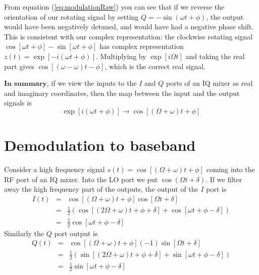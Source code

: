 From equation (\ref{eq:modulationRaw}) you can see that if we reverse the orientation of our rotating signal by setting $Q=-\sin(\omega t + \phi)$, the output would have been negatively detuned, and would have had a negative phase shift. This is consistent with our complex representation: the clockwise rotating signal $\cos[\omega t + \phi] - \sin[\omega t + \phi]$ has complex representation $z(t) = \exp[-i(\omega t + \phi)]$. Multiplying by $\exp[i\Omega t]$ and taking the real part gives $\cos[(\omega-\omega)t - \phi]$, which is the correct real signal.

$\textbf{In summary}$, if we view the inputs to the $I$ and $Q$ ports of an IQ mixer as real and imaginary coordinates, then the map between the input and the output signals is \begin{equation}
\exp[i(\omega t + \phi)] \rightarrow \cos[(\Omega+\omega)t + \phi] \end{equation}

\section{Demodulation to baseband}

Consider a high frequency signal $s(t) = \cos [ (\Omega+\omega)t + \phi ]$ coming into the RF port of an IQ mixer. Into the LO port we put $\cos(\Omega t + \delta)$. If we filter away the high frequency part of the outputs, the output of the $I$ port is \begin{eqnarray}
I(t) &=& \cos [ (\Omega + \omega)t + \phi ]\cos [ \Omega t + \delta ] \nonumber \\
&=& \frac{1}{2}\left( \cos [(2\Omega + \omega)t + \phi + \delta ] + \cos [ \omega t + \phi - \delta ] \right) \nonumber \\
&=& \frac{1}{2} \cos [ \omega t + \phi - \delta ] \end{eqnarray}
Similarly the $Q$ port output is \begin{eqnarray}
Q(t) &=& \cos [ (\Omega + \omega)t + \phi ](-1)\sin [ \Omega t + \delta ] \nonumber \\
&=& \frac{1}{2}\left( \sin [(2\Omega + \omega)t + \phi + \delta ] + \sin [ \omega t + \phi - \delta ] \right) \nonumber \\
&=& \frac{1}{2} \sin [ \omega t + \phi - \delta ] \end{eqnarray}

